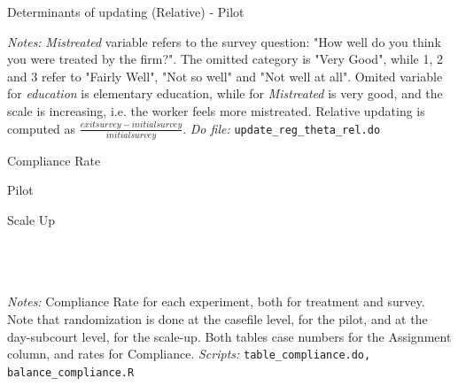 \documentclass[11pt]{article}
\begin{document}
\begin{landscape}
\begin{table}[H]
\caption{Determinants of updating (Relative) - Pilot}
\label{Table_determinants_updating}
\begin{center}
\scriptsize{}
\end{center}
 \footnotesize
\textit{Notes:} 
\emph{Mistreated} variable refers to the survey question: "How well do you think you were treated by the firm?". The omitted category is "Very Good", while 1, 2 and 3 refer to "Fairly Well", "Not so well" and "Not well at all".
Omited variable for \emph{education} is elementary education, while for \emph{Mistreated} is very good, and the scale is increasing, i.e. the worker feels more mistreated. Relative updating is computed as $\frac{exitsurvey-initialsurvey}{initialsurvey}$.
\textit{Do file: } \texttt{update\_reg\_theta\_rel.do}
\end{table}
\end{landscape}


\begin{table}[H]
    \caption{Compliance Rate}
    \label{Table_compliance}
    \begin{subtable}{1\textwidth}
      \centering
        \caption{Pilot}
        \scriptsize{}
    \end{subtable}%
    
    \bigskip
    \begin{subtable}{1\textwidth}
      \centering
        \caption{Scale Up}
        \scriptsize{}
    \end{subtable}
           \footnotesize
           \\
           \\
           \\
  \textit{Notes:} 
    Compliance Rate for each experiment, both for treatment and survey. Note that randomization is done at the casefile level, for the pilot, and at the day-subcourt level, for the scale-up. Both tables case numbers for the Assignment column, and rates for Compliance.
    \textit{Scripts: } \texttt{table\_compliance.do, balance\_compliance.R}
\end{table}
\end{document}
